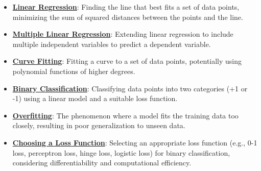 \documentclass{article}%
\begin{document}
\begin{itemize}[leftmargin=*]%
\item \href{https://purdue.brightspace.com/d2l/common/assets/pdfjs-d2l-dist/1.0.14-legacy/web/viewer.html?file=%2Fcontent%2Fenforced%2F1095467-wl.202510.CS.24300.001%2F05L2-ML Basics.pdf%3Fou%3D1095467&lang=en-us&container=d2l-fileviewer-rendered-pdf&fullscreen=d2l-fileviewer-rendered-pdf-dialog&height=667#page=6}{\textbf{Linear Regression}}: Finding the line that best fits a set of data points, minimizing the sum of squared distances between the points and the line.%
\item \href{https://purdue.brightspace.com/d2l/common/assets/pdfjs-d2l-dist/1.0.14-legacy/web/viewer.html?file=%2Fcontent%2Fenforced%2F1095467-wl.202510.CS.24300.001%2F05L2-ML Basics.pdf%3Fou%3D1095467&lang=en-us&container=d2l-fileviewer-rendered-pdf&fullscreen=d2l-fileviewer-rendered-pdf-dialog&height=667#page=11}{\textbf{Multiple Linear Regression}}: Extending linear regression to include multiple independent variables to predict a dependent variable.%
\item \href{https://purdue.brightspace.com/d2l/common/assets/pdfjs-d2l-dist/1.0.14-legacy/web/viewer.html?file=%2Fcontent%2Fenforced%2F1095467-wl.202510.CS.24300.001%2F05L2-ML Basics.pdf%3Fou%3D1095467&lang=en-us&container=d2l-fileviewer-rendered-pdf&fullscreen=d2l-fileviewer-rendered-pdf-dialog&height=667#page=13}{\textbf{Curve Fitting}}: Fitting a curve to a set of data points, potentially using polynomial functions of higher degrees.%
\item \href{https://purdue.brightspace.com/d2l/common/assets/pdfjs-d2l-dist/1.0.14-legacy/web/viewer.html?file=%2Fcontent%2Fenforced%2F1095467-wl.202510.CS.24300.001%2F05L2-ML Basics.pdf%3Fou%3D1095467&lang=en-us&container=d2l-fileviewer-rendered-pdf&fullscreen=d2l-fileviewer-rendered-pdf-dialog&height=667#page=20}{\textbf{Binary Classification}}: Classifying data points into two categories (+1 or -1) using a linear model and a suitable loss function.%
\item \href{https://purdue.brightspace.com/d2l/common/assets/pdfjs-d2l-dist/1.0.14-legacy/web/viewer.html?file=%2Fcontent%2Fenforced%2F1095467-wl.202510.CS.24300.001%2F05L2-ML Basics.pdf%3Fou%3D1095467&lang=en-us&container=d2l-fileviewer-rendered-pdf&fullscreen=d2l-fileviewer-rendered-pdf-dialog&height=667#page=14}{\textbf{Overfitting}}: The phenomenon where a model fits the training data too closely, resulting in poor generalization to unseen data.%
\item \href{https://purdue.brightspace.com/d2l/common/assets/pdfjs-d2l-dist/1.0.14-legacy/web/viewer.html?file=%2Fcontent%2Fenforced%2F1095467-wl.202510.CS.24300.001%2F05L2-ML Basics.pdf%3Fou%3D1095467&lang=en-us&container=d2l-fileviewer-rendered-pdf&fullscreen=d2l-fileviewer-rendered-pdf-dialog&height=667#page=25}{\textbf{Choosing a Loss Function}}: Selecting an appropriate loss function (e.g., 0-1 loss, perceptron loss, hinge loss, logistic loss) for binary classification, considering differentiability and computational efficiency.%

\end{itemize}
\end{document}
